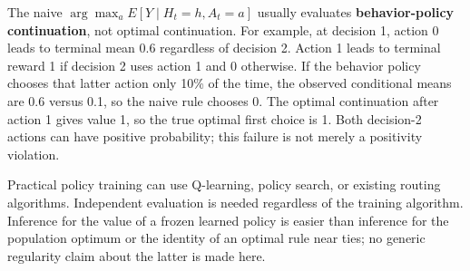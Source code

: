 The naive \(\arg\max_aE[Y\mid H_t=h,A_t=a]\) usually evaluates \textbf{behavior-policy continuation}, not optimal continuation. For example, at decision 1, action 0 leads to terminal mean 0.6 regardless of decision 2. Action 1 leads to terminal reward 1 if decision 2 uses action 1 and 0 otherwise. If the behavior policy chooses that latter action only 10\% of the time, the observed conditional means are 0.6 versus 0.1, so the naive rule chooses 0. The optimal continuation after action 1 gives value 1, so the true optimal first choice is 1. Both decision-2 actions can have positive probability; this failure is not merely a positivity violation.

Practical policy training can use Q-learning, policy search, or existing routing algorithms. Independent evaluation is needed regardless of the training algorithm. Inference for the value of a frozen learned policy is easier than inference for the population optimum or the identity of an optimal rule near ties; no generic regularity claim about the latter is made here.

